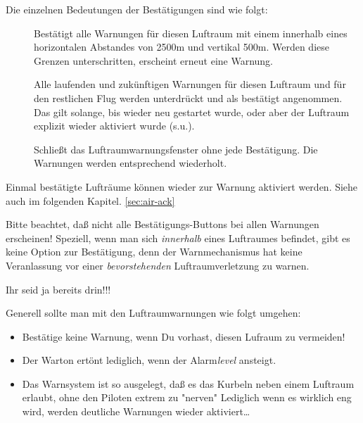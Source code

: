Die einzelnen Bedeutungen der Bestätigungen sind wie folgt:

\begin{description}

\item[]  Bestätigt alle Warnungen für diesen Luftraum mit einem
innerhalb eines horizontalen Abstandes von 2500m und vertikal 500m.
Werden diese  Grenzen unterschritten, erscheint erneut eine Warnung.

\item[]  Alle laufenden und zukünftigen Warnungen für diesen Luftraum
und für den restlichen Flug werden unterdrückt und als bestätigt angenommen.
Das gilt solange, bis \xc wieder neu gestartet wurde, oder aber der
Luftraum explizit wieder aktiviert wurde (s.u.).

\item[] Schließt das Luftraumwarnungsfenster ohne jede Bestätigung.
Die Warnungen werden entsprechend wiederholt.
\end{description}

Einmal bestätigte Lufträume können  wieder zur Warnung aktiviert werden.  Siehe auch im folgenden Kapitel. \ref{sec:air-ack}

 Bitte beachtet, daß nicht alle Bestätigungs-Buttons bei allen Warnungen erscheinen!
Speziell, wenn man sich \textsl{innerhalb} eines Luftraumes befindet, gibt es keine Option
zur Bestätigung, denn der Warnmechanismus hat keine Veranlassung vor einer \textsl{bevorstehenden} Luftraumverletzung zu warnen.

Ihr seid ja bereits drin!!!

Generell sollte man mit den Luftraumwarnungen wie folgt umgehen:
\begin{itemize}
\item Bestätige keine Warnung, wenn Du vorhast, diesen Lufraum zu vermeiden!
\item Der Warton ertönt lediglich, wenn der Alarm\textsl{level} ansteigt.
\item Das Warnsystem ist so ausgelegt, daß es das Kurbeln neben einem Luftraum erlaubt,
ohne den Piloten extrem zu "nerven" Lediglich wenn es wirklich eng wird, werden
deutliche Warnungen wieder aktiviert\dots
\end{itemize}

